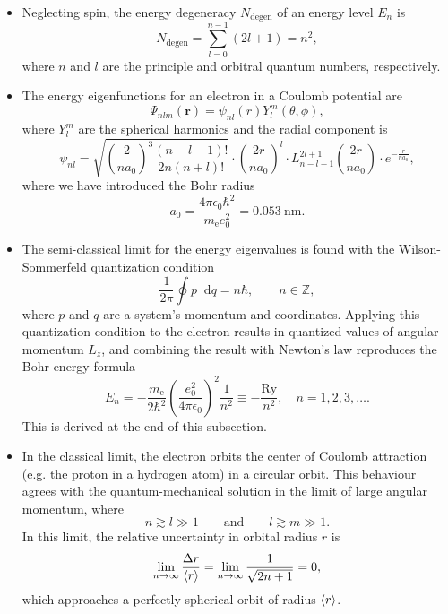 \documentclass[11pt, a4paper]{article}
\newcommand{\diff}{\mathop{}\!\mathrm{d}} %
\newcommand{\eqtext}[1]{\qquad \text{#1} \qquad}
\renewcommand{\vec}[1]{\bm{#1}}  %
\renewcommand{\r}{\vec{r}}  %
\newcommand{\p}{\psi}  %
\renewcommand{\P}{\Psi}  %
\begin{document}
\begin{itemize}
	\item Neglecting spin, the energy degeneracy $ N_{\text{degen}} $ of an energy level $ E_{n} $ is
	\begin{equation*}
        N_{\text{degen}} = \sum_{l = 0}^{n-1}(2l+1) = n^{2},
	\end{equation*}
    where $ n $ and $ l $ are the principle and orbitral quantum numbers, respectively.
    
	\item The energy eigenfunctions for an electron in a Coulomb potential are
	\begin{equation*}
		\P_{nlm}(\r) = \p_{nl}(r)Y_{l}^{m}(\theta, \phi),
	\end{equation*}
	where $ Y_{l}^{m} $ are the spherical harmonics and the radial component is
	\begin{equation*}
		\p_{nl} = \sqrt{\left(\frac{2}{na_{0}}\right)^{3}\frac{(n - l - 1)!}{2n(n + l)!}}\cdot \left(\frac{2r}{na_{0}}\right)^{l}\cdot L_{n - l - 1}^{2l + 1} \left(\frac{2r}{na_{0}}\right)\cdot e^{-\frac{r}{na_{0}}},
	\end{equation*}
	where we have introduced the Bohr radius
	\begin{equation*}
		a_{0} = \frac{4\pi \epsilon_{0}\hbar^{2}}{m_{\text{e}} e_{0}^{2}} = \SI{0.053}{\nano \meter}.
	\end{equation*}

	\item The semi-classical limit for the energy eigenvalues is found with the Wilson-Sommerfeld quantization condition
	\begin{equation*}
		\frac{1}{2\pi}\oint p \diff q = n \hbar, \qquad n \in \mathbb{Z},
	\end{equation*}
	where $ p $ and $ q $ are a system's momentum and coordinates. Applying this quantization condition to the electron results in quantized values of angular momentum $ L_{z} $, and combining the result with Newton's law reproduces the Bohr energy formula
	\begin{equation*}
		E_{n} = - \frac{m_{\text{e}}}{2\hbar^{2}}\left(\frac{e_{0}^{2}}{4\pi \epsilon_{0}}\right)^{2}\frac{1}{n^{2}} \equiv - \frac{\text{Ry}}{n^{2}}, \quad n = 1, 2, 3, \ldots.
	\end{equation*}
    This is derived at the end of this subsection.
	
    \item In the classical limit, the electron orbits the center of Coulomb attraction (e.g. the proton in a hydrogen atom) in a circular orbit. This behaviour agrees with the quantum-mechanical solution in the limit of large angular momentum, where
	\begin{equation*}
		n \gtrsim l \gg 1 \eqtext{and} l \gtrsim m \gg 1.
	\end{equation*}
    In this limit, the relative uncertainty in orbital radius $ r $ is
	\begin{equation*}
		\lim_{n \to \infty} \frac{\Delta r}{\ev{r}} = \lim_{n \to \infty} \frac{1}{\sqrt{2n + 1}} = 0,
	\end{equation*}
	which approaches a perfectly spherical orbit of radius $ \ev{r} $.
	

\end{itemize}
\end{document}
